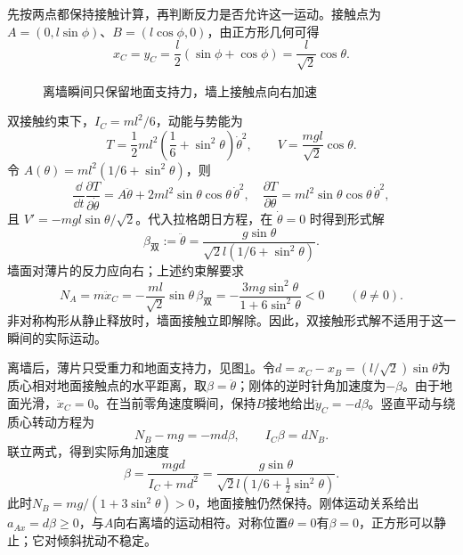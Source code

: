 \begin{solution}
先按两点都保持接触计算，再判断反力是否允许这一运动。接触点为$A=(0,l\sin\phi)$、$B=(l\cos\phi,0)$，由正方形几何可得
\[
 x_C=y_C=\frac l2(\sin\phi+\cos\phi)=\frac l{\sqrt2}\cos\theta.
\]

\begin{figure}[H]\centering
{}
\caption{离墙瞬间只保留地面支持力，墙上接触点向右加速}\label{fig:hw3-4-s}
\end{figure}

双接触约束下，$I_C=ml^2/6$，动能与势能为
\[
 T=\frac12ml^2\left(\frac16+\sin^2\theta\right)\dot\theta^2,
 \qquad V=\frac{mgl}{\sqrt2}\cos\theta.
\]
令 $A(\theta)=ml^2(1/6+\sin^2\theta)$，则
\[
\frac{\dd}{\dd t}\frac{\partial T}{\partial\dot\theta}
=A\ddot\theta+2ml^2\sin\theta\cos\theta\,\dot\theta^2,
\quad
\frac{\partial T}{\partial\theta}=ml^2\sin\theta\cos\theta\,\dot\theta^2,
\]
且 $V'=-mgl\sin\theta/\sqrt2$。代入拉格朗日方程，在 $\dot\theta=0$ 时得到形式解
\[
 \beta_{\text{双}}:=\ddot\theta=
 \frac{g\sin\theta}{\sqrt2l(1/6+\sin^2\theta)}.
\]
墙面对薄片的反力应向右；上述约束解要求
\[
 N_A=m\ddot x_C
 =-\frac{ml}{\sqrt2}\sin\theta\,\beta_{\text{双}}
 =-\frac{3mg\sin^2\theta}{1+6\sin^2\theta}<0
 \qquad(\theta\ne0).
\]
非对称构形从静止释放时，墙面接触立即解除。因此，双接触形式解不适用于这一瞬间的实际运动。

离墙后，薄片只受重力和地面支持力，见图\ref{fig:hw3-4-s}。令$d=x_C-x_B=(l/\sqrt2)\sin\theta$为质心相对地面接触点的水平距离，取$\beta=\ddot\theta$；刚体的逆时针角加速度为$-\beta$。由于地面光滑，$\ddot x_C=0$。在当前零角速度瞬间，保持$B$接地给出$\ddot y_C=-d\beta$。竖直平动与绕质心转动方程为
\[
 N_B-mg=-md\beta,\qquad I_C\beta=dN_B.
\]
联立两式，得到实际角加速度
\[
 \boxed{\beta=\frac{mgd}{I_C+md^2}
 =\frac{g\sin\theta}{\sqrt2l(1/6+\tfrac12\sin^2\theta)}}.
\]
此时$N_B=mg/(1+3\sin^2\theta)>0$，地面接触仍然保持。刚体运动关系给出$a_{Ax}=d\beta\ge0$，与$A$向右离墙的运动相符。对称位置$\theta=0$有$\beta=0$，正方形可以静止；它对倾斜扰动不稳定。


\end{solution}



